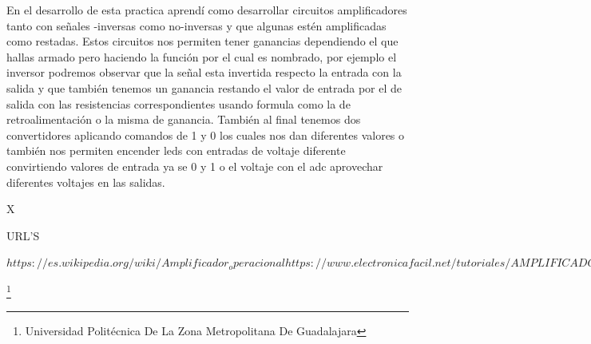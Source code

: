 \documentclass[10pt,a4paper]{article}
\begin{document}
En el desarrollo de esta practica aprendí como desarrollar circuitos amplificadores tanto con señales -inversas como no-inversas y que algunas estén amplificadas como restadas. Estos circuitos nos permiten tener ganancias dependiendo el que hallas armado pero haciendo la función por el cual es nombrado, por ejemplo el inversor podremos observar que la señal esta invertida respecto la entrada con la salida y que también tenemos un ganancia restando el valor de entrada por el de salida con las resistencias correspondientes usando formula como la de retroalimentación o la misma de ganancia. También al final tenemos dos convertidores aplicando comandos de 1 y 0 los cuales nos dan diferentes valores o también nos permiten encender leds con entradas de voltaje diferente convirtiendo valores de entrada ya se 0 y 1 o el voltaje con el adc aprovechar diferentes voltajes en las salidas.




\begin{thebibliography}{X}

 \textsc{URL'S}


$https://es.wikipedia.org/wiki/Amplificador_operacional 
https://www.electronicafacil.net/tutoriales/AMPLIFICADOR-INVERSOR.html
http://www.electronicasi.com/ensenanzas/electronica-avanzada/electronica-universitaria/electronica-analogica/amplificador-no-inversor/
http://hyperphysics.phy-astr.gsu.edu/hbasees/Electronic/opampvar6.html
https://unicrom.com/amplificador-sumador-con-amplificadores-operacionales.$

\end{thebibliography}


\footnote{Universidad Politécnica De La Zona Metropolitana De Guadalajara} 
\end{document}
